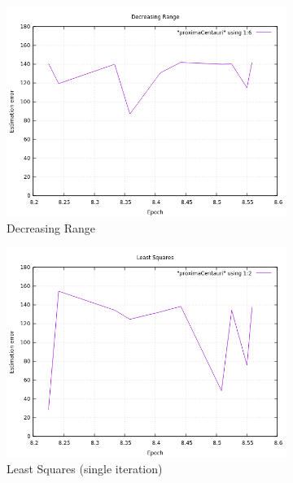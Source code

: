\begin{figure}[!htb]
	\begin{subfigure}[b]{0.5\textwidth}
		\includegraphics[width=\linewidth]{images/resultsStellar/proximaCentauri/DR2Epochs10.png}
		\caption{Decreasing Range}
	\end{subfigure}
	\hfill
	\begin{subfigure}[b]{0.5\textwidth}
		\includegraphics[width=\linewidth]{images/resultsStellar/proximaCentauri/LS2Epochs10.png}
		\caption{Least Squares (single iteration)}
	\end{subfigure}
	\hfill
	\begin{subfigure}[b]{0.5\textwidth}

\end{subfigure}
\end{figure}
